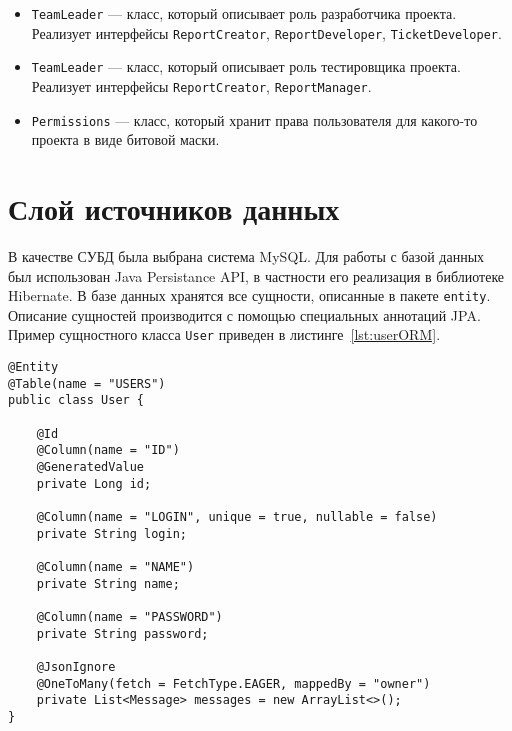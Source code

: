 \begin{itemize}
\item \texttt{TeamLeader} --- класс, который описывает роль разработчика проекта. Реализует интерфейсы \texttt{ReportCreator}, \texttt{ReportDeveloper}, \texttt{TicketDeveloper}.

\item \texttt{TeamLeader} --- класс, который описывает роль тестировщика проекта. Реализует интерфейсы \texttt{ReportCreator}, \texttt{ReportManager}.

\item \texttt{Permissions} --- класс, который хранит права пользователя для какого-то проекта в виде битовой маски.
\end{itemize}

\section{Слой источников данных}
В качестве СУБД была выбрана система MySQL. Для работы с базой данных был использован Java Persistance API, в частности его реализация в библиотеке Hibernate. В базе данных хранятся все сущности, описанные в пакете \texttt{entity}. Описание сущностей производится с помощью специальных аннотаций JPA. Пример сущностного класса \texttt{User} приведен в листинге~\ref{lst:userORM}.
\begin{lstlisting}[style=crs_java, label={lst:userORM}, caption={Описание сущности}]
@Entity
@Table(name = "USERS")
public class User {

    @Id
    @Column(name = "ID")
    @GeneratedValue
    private Long id;

    @Column(name = "LOGIN", unique = true, nullable = false)
    private String login;

    @Column(name = "NAME")
    private String name;

    @Column(name = "PASSWORD")
    private String password;

    @JsonIgnore
    @OneToMany(fetch = FetchType.EAGER, mappedBy = "owner")
    private List<Message> messages = new ArrayList<>();
}
\end{lstlisting}

